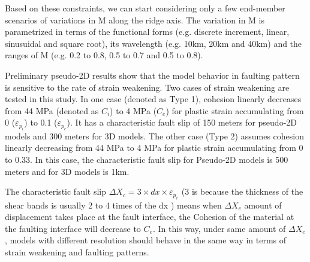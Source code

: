 Based on these constraints, we can start considering only a few end-member scenarios of variations in M along the ridge axis. The variation in M is parametrized in terms of the functional forms (e.g. discrete increment, linear, sinusuidal and square root), its wavelength (e.g. 10km, 20km and 40km) and the ranges of M (e.g. 0.2 to 0.8, 0.5 to 0.7 and 0.5 to 0.8). 

Preliminary pseudo-2D results show that the model behavior in faulting pattern is sensitive to the rate of strain weakening. Two cases of strain weakening are tested in this study. In one case (denoted as Type 1), cohesion linearly decreases from 44 MPa (denoted as $C_{i}$) to 4 MPa ($C_{e}$) for plastic strain accumulating from 0 ($\varepsilon_{p_{i}}$) to 0.1 ($\varepsilon_{p_{e}}$). It has a characteristic fault slip of 150 meters for pseudo-2D models and 300 meters for 3D models. The other case (Type 2) assumes cohesion linearly decreasing from 44 MPa to 4 MPa for plastic strain accumulating from 0 to 0.33. In this case, the characteristic fault slip for Pseudo-2D models is 500 meters and for 3D models is 1km.

The characteristic fault slip $\Delta X_{c}=3 \times dx \times \varepsilon_{p_{e}}$ (3 is because the thickness of the shear bands is usually 2 to 4 times of the dx \citep{Lavier2000}) means when $\Delta X_{c}$ amount of displacement takes place at the fault interface, the Cohesion of the material at the faulting interface will decrease to $C_{e}$. In this way, under same amount of $\Delta X_{c}$, models with different resolution should behave in the same way in terms of strain weakening and faulting patterns. 

